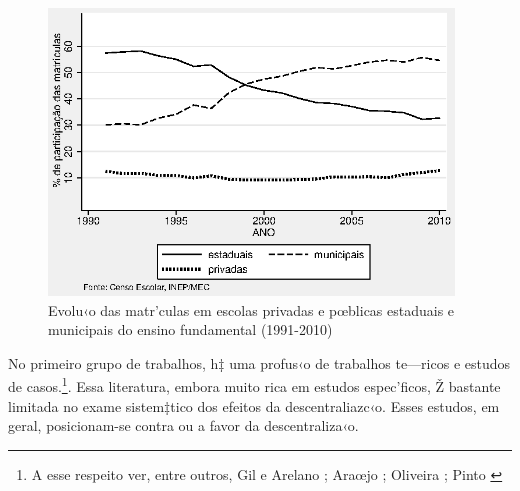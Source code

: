 \documentclass[a4paper, 12pt]{article}
\begin{document}
\vspace*{1cm} 

\begin{figure}[h]
\centering
\begin{footnotesize}
\caption{Evolu‹o das matr’culas em escolas privadas e pœblicas estaduais e municipais do ensino fundamental (1991-2010)} 
\label{fig:share_matriculas}                             
 \includegraphics[height=3in]{share_matriculas}
\end{footnotesize}
\end{figure}
 
\vspace*{1cm} 


No primeiro grupo de trabalhos, h‡ uma profus‹o de trabalhos te—ricos e estudos de casos.\footnote{A esse respeito ver, entre outros, Gil e Arelano \citeyear{gil_contra_2004};  Araœjo \citeyear{araujo_municipio_2005}; Oliveira \citeyear{oliveira_municipalizacao_1999}; Pinto \citeyear{pinto_os_2000}}. Essa literatura, embora muito rica em estudos espec’ficos, Ž bastante limitada no exame sistem‡tico dos efeitos da descentraliazc‹o. Esses estudos, em geral, posicionam-se contra ou a favor da descentraliza‹o. 
\end{document}
